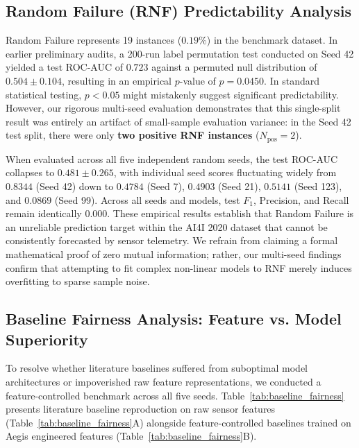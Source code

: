 \documentclass[conference]{IEEEtran}
\begin{document}
\begin{itemize}
\subsection{Random Failure (RNF) Predictability Analysis}
Random Failure represents 19 instances ($0.19\%$) in the benchmark dataset. In earlier preliminary audits, a 200-run label permutation test conducted on Seed 42 yielded a test ROC-AUC of $0.723$ against a permuted null distribution of $0.504 \pm 0.104$, resulting in an empirical $p$-value of $p = 0.0450$. In standard statistical testing, $p < 0.05$ might mistakenly suggest significant predictability. However, our rigorous multi-seed evaluation demonstrates that this single-split result was entirely an artifact of small-sample evaluation variance: in the Seed 42 test split, there were only \textbf{two positive RNF instances} ($N_{\text{pos}} = 2$). 

When evaluated across all five independent random seeds, the test ROC-AUC collapses to $\mathbf{0.481 \pm 0.265}$, with individual seed scores fluctuating widely from $0.8344$ (Seed 42) down to $0.4784$ (Seed 7), $0.4903$ (Seed 21), $0.5141$ (Seed 123), and $0.0869$ (Seed 99). Across all seeds and models, test $F_1$, Precision, and Recall remain identically $0.000$. These empirical results establish that Random Failure is an unreliable prediction target within the AI4I 2020 dataset that cannot be consistently forecasted by sensor telemetry. We refrain from claiming a formal mathematical proof of zero mutual information; rather, our multi-seed findings confirm that attempting to fit complex non-linear models to RNF merely induces overfitting to sparse sample noise.

\subsection{Baseline Fairness Analysis: Feature vs. Model Superiority}
To resolve whether literature baselines suffered from suboptimal model architectures or impoverished raw feature representations, we conducted a feature-controlled benchmark across all five seeds. Table~\ref{tab:baseline_fairness} presents literature baseline reproduction on raw sensor features (Table~\ref{tab:baseline_fairness}A) alongside feature-controlled baselines trained on Aegis engineered features (Table~\ref{tab:baseline_fairness}B).


\end{itemize}
\end{document}

